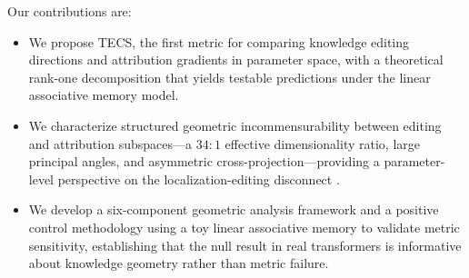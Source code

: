 Our contributions are:
\begin{itemize}
\item We propose TECS, the first metric for comparing knowledge editing directions and attribution gradients in parameter space, with a theoretical rank-one decomposition that yields testable predictions under the linear associative memory model.
\item We characterize structured geometric incommensurability between editing and attribution subspaces---a $34{:}1$ effective dimensionality ratio, large principal angles, and asymmetric cross-projection---providing a parameter-level perspective on the localization-editing disconnect \citep{hase2023does}.
\item We develop a six-component geometric analysis framework and a positive control methodology using a toy linear associative memory to validate metric sensitivity, establishing that the null result in real transformers is informative about knowledge geometry rather than metric failure.
\end{itemize}
